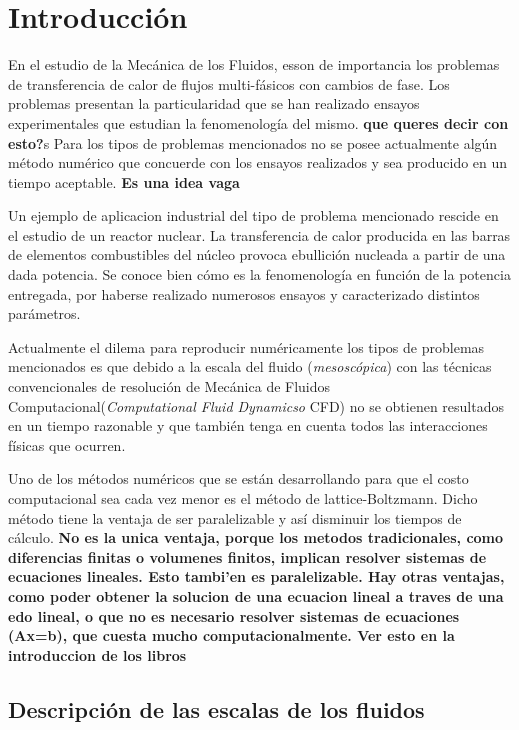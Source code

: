\chapter{Introducción}
\graphicspath{{figs/cap1/}}
\label{cap1}


En el estudio de la Mecánica de los Fluidos, esson de importancia los problemas de transferencia de calor de flujos multi-fásicos con cambios de fase. 
Los problemas presentan la particularidad que se han realizado ensayos experimentales que estudian la fenomenología del mismo. \textbf{que queres decir con esto?}s
Para los tipos de problemas mencionados no se posee actualmente algún método numérico que concuerde con los ensayos realizados y sea producido en un tiempo aceptable. \textbf{Es una idea vaga}

Un ejemplo de aplicacion industrial del tipo de problema mencionado rescide en el estudio de un reactor nuclear. La transferencia de calor producida en las barras de elementos combustibles del núcleo provoca ebullición nucleada a partir de una dada potencia. Se conoce bien cómo es la fenomenología en función de la potencia entregada, por haberse realizado numerosos ensayos y caracterizado distintos parámetros. 

Actualmente el dilema para reproducir numéricamente los tipos de problemas mencionados es que debido a la escala del fluido (\textit{mesoscópica}) con las técnicas convencionales de resolución de Mecánica de Fluidos Computacional(\textit{Computational Fluid Dynamicso} CFD) no se obtienen resultados en un tiempo razonable y que también tenga en cuenta todos las interacciones físicas que ocurren.

Uno de los métodos numéricos que se están desarrollando para que el costo computacional sea cada vez menor es el método de lattice-Boltzmann. Dicho método tiene la ventaja de ser paralelizable y así disminuir los tiempos de cálculo. \textbf{No es la unica ventaja, porque los metodos tradicionales, como diferencias finitas o volumenes finitos, implican resolver sistemas de ecuaciones lineales. Esto tambi’en es paralelizable. Hay otras ventajas, como poder obtener la solucion de una ecuacion lineal a traves de una edo lineal, o que no es necesario resolver sistemas de ecuaciones (Ax=b), que cuesta mucho computacionalmente. Ver esto en la introduccion de los libros}

\section{Descripción de las escalas de los fluidos}


